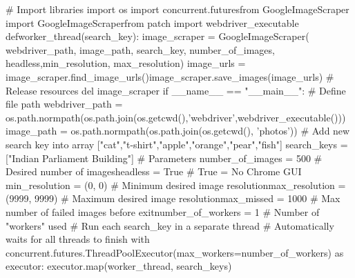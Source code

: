 \documentclass[10pt]{article} %
\begin{document}
\begin{spacing}{1.5}
\noindent \# Import libraries\newline
import os\newline
import concurrent.futuresfrom GoogleImageScraper
\newline 
import GoogleImageScraperfrom patch \newline
import webdriver\_executable\newline
defworker\_thread(search\_key):\newline
image\_scraper = GoogleImageScraper(    \newline
webdriver\_path, image\_path, search\_key, number\_of\_images, headless,\newline min\_resolution, max\_resolution)  \newline 
image\_urls = image\_scraper.find\_image\_urls()\newline    image\_scraper.save\_images(image\_urls) \newline
\# Release resources \newline
del image\_scraper \newline 
if \_\_name\_\_ == "\_\_main\_\_":    
\# Define file path    \newline
webdriver\_path = os.path.normpath(os.path.join(os.getcwd(),'webdriver',webdriver\_executable()))  \newline
image\_path = os.path.normpath(os.path.join(os.getcwd(), 'photos'))  \newline
\# Add new search key into array ["cat","t-shirt","apple","orange","pear","fish"]  \newline
search\_keys = ["Indian Parliament Building"]  \newline
\# Parameters  \newline
number\_of\_images = 500     \hspace{2mm}    \# Desired number of images\newline headless = True    \hspace{2mm}    \# True = No Chrome GUI \newline   min\_resolution = (0, 0)           \# Minimum desired image resolution\newline max\_resolution = (9999, 9999)     \# Maximum desired image resolution\newline max\_missed = 1000              \# Max number of failed images before exit\newline    number\_of\_workers = 1       \# Number of "workers" used \newline    \# Run each search\_key in a separate thread \newline
\# Automatically waits for all threads to finish    with concurrent.futures.ThreadPoolExecutor(max\_workers=\newline number\_of\_workers) as executor: \newline       executor.map(worker\_thread, search\_keys)


\end{spacing}
\end{document}
